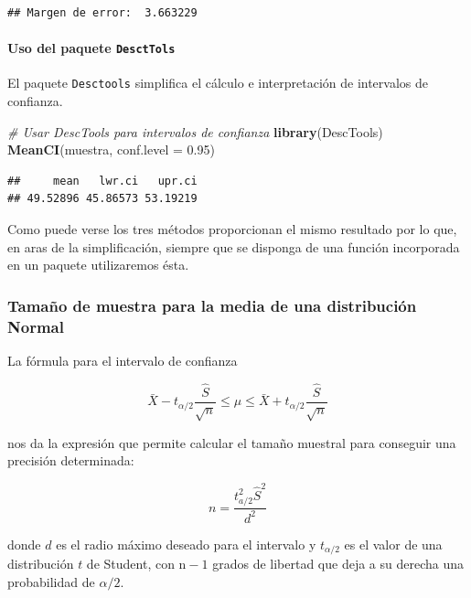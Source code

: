 \documentclass[
]{article}
\newenvironment{Shaded}{\begin{snugshade}}{\end{snugshade}}
\newcommand{\AttributeTok}[1]{\textcolor[rgb]{0.13,0.29,0.53}{#1}}
\newcommand{\CommentTok}[1]{\textcolor[rgb]{0.56,0.35,0.01}{\textit{#1}}}
\newcommand{\FloatTok}[1]{\textcolor[rgb]{0.00,0.00,0.81}{#1}}
\newcommand{\FunctionTok}[1]{\textcolor[rgb]{0.13,0.29,0.53}{\textbf{#1}}}
\newcommand{\NormalTok}[1]{#1}
\begin{document}
\begin{verbatim}
## Margen de error:  3.663229
\end{verbatim}

\paragraph{\texorpdfstring{Uso del paquete \texttt{DesctTols}}{Uso del paquete DesctTols}}\label{uso-del-paquete-descttols}

El paquete \texttt{Desctools} simplifica el cálculo e interpretación de intervalos de confianza.

\begin{Shaded}
\begin{Highlighting}[]
\CommentTok{\# Usar DescTools para intervalos de confianza}
\FunctionTok{library}\NormalTok{(DescTools)}
\FunctionTok{MeanCI}\NormalTok{(muestra, }\AttributeTok{conf.level =} \FloatTok{0.95}\NormalTok{)}
\end{Highlighting}
\end{Shaded}

\begin{verbatim}
##     mean   lwr.ci   upr.ci 
## 49.52896 45.86573 53.19219
\end{verbatim}

Como puede verse los tres métodos proporcionan el mismo resultado por lo que, en aras de la simplificación, siempre que se disponga de una función incorporada en un paquete utilizaremos ésta.

\subsubsection{Tamaño de muestra para la media de una distribución Normal}\label{tamauxf1o-de-muestra-para-la-media-de-una-distribuciuxf3n-normal}

La fórmula para el intervalo de confianza

\[
\bar{X}-t_{\alpha / 2} \frac{\hat{S}}{\sqrt{n}} \leq \mu \leq \bar{X}+t_{\alpha / 2} \frac{\hat{S}}{\sqrt{n}}
\]

nos da la expresión que permite calcular el tamaño muestral para conseguir una precisión determinada:

\[
n=\frac{t_{a / 2}^{2} \hat{S}^{2}}{d^{2}}
\]

donde \(d\) es el radio máximo deseado para el intervalo y \(t_{\alpha / 2}\) es el valor de una distribución \(t\) de Student, con \(\mathrm{n}-1\) grados de libertad que deja a su derecha una probabilidad de \(\alpha / 2\).
\end{document}
